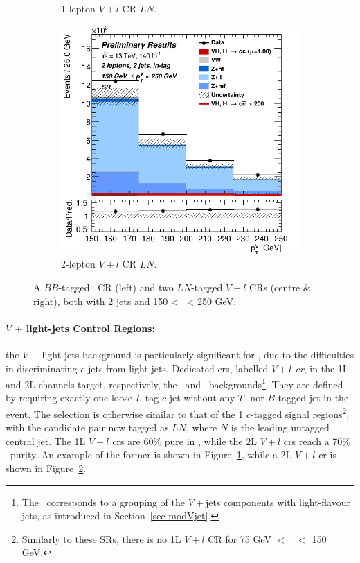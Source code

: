 \begin{figure}[h!]
\begin{subfigure}[b]{0.32\textwidth}
      \caption{1-lepton $V+l$ CR $LN$.}
      \label{fig:plots_VHcc_ex_1L_CRvl}
  \end{subfigure}
  \begin{subfigure}[b]{0.32\textwidth}
    \centering
    \includegraphics[width=\textwidth]{Images/VH/Own_fit/prefit_VHcc/Region_distpTV_BMax250_BMin150_DSR_J2_TTypeln_T1_L2_Y6051_Prefit.png}
    \caption{2-lepton $V+l$ CR $LN$.}
    \label{fig:plots_VHcc_ex_2L_CRvl}
\end{subfigure}
  \caption{A $BB$-tagged \lowdr\ CR (left) and two $LN$-tagged $V+l$ CRs (centre \& right), both with 2 jets and 150 < \ptv\ < 250 GeV.}
  \label{fig:plots_VH_ex_CRL_CRvl}
\end{figure} 

\paragraph{$V$ $+$ light-jets Control Regions:} the $V$ $+$ light-jets background is particularly significant for \vhc, due to the difficulties in discriminating $c$-jets from light-jets. Dedicated \gls{cr}s, labelled \textit{$V+l$ \gls{cr}}, in the 1L and 2L channels target, respectively, the \wlf\ and \zlf\ backgrounds\footnote{The \vlf\ corresponds to a grouping of the $V+$jets components with light-flavour jets, as introduced in Section~\ref{sec-modVjet}.}. They are defined by requiring exactly one loose $L$-tag $c$-jet without any $T$- nor $B$-tagged jet in the event. The selection is otherwise similar to that of the 1 $c$-tagged signal regions\footnote{Similarly to these SRs, there is no 1L $V+l$ CR for 75 GeV $<$ \ptv\ $<$ 150 GeV.}, with the candidate pair now tagged as $LN$, where $N$ is the leading untagged central jet. The 1L $V+l$ \gls{cr}s are 60\% pure in \wlf, while the 2L $V+l$ \gls{cr}s reach a 70\% \zlf\ purity. An example of the former is shown in Figure~\ref{fig:plots_VHcc_ex_1L_CRvl}, while a 2L $V+l$ \gls{cr} is shown in Figure~\ref{fig:plots_VHcc_ex_2L_CRvl}. 

